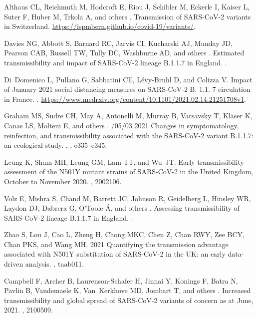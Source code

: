 \documentclass[12pt]{article}
\begin{document}
\begin{thebibliography}{10}

Althaus CL, Reichmuth M, Hodcroft E, Riou J, Schibler M, Eckerle I, Kaiser L,
  Suter F, Huber M, Trkola A, and others .
 {Transmission of SARS-CoV-2 variants in Switzerland}.
\newblock \url{https://ispmbern.github.io/covid-19/variants/}.

Davies NG, Abbott S, Barnard RC, Jarvis CI, Kucharski AJ, Munday JD, Pearson
  CAB, Russell TW, Tully DC, Washburne AD, and others .
 {Estimated transmissibility and impact of SARS-CoV-2 lineage
  B.1.1.7 in England}.
.

Di~Domenico L, Pullano G, Sabbatini CE, L{\'e}vy-Bruhl D, and Colizza V.
 {Impact of January 2021 social distancing measures on SARS-CoV-2
  B. 1.1. 7 circulation in France}.
.
\newblock \url{https://www.medrxiv.org/content/10.1101/2021.02.14.21251708v1}.

Graham MS, Sudre CH, May A, Antonelli M, Murray B, Varsavsky T, Kl{\"a}ser K,
  Canas LS, Molteni E, and others .
/05/03 2021 {Changes in symptomatology, reinfection, and
  transmissibility associated with the SARS-CoV-2 variant B.1.1.7: an
  ecological study}.
.
, e335--e345.

Leung K, Shum MH, Leung GM, Lam TT, and Wu~JT.
 {Early transmissibility assessment of the N501Y mutant strains
  of SARS-CoV-2 in the United Kingdom, October to November 2020}.
, 2002106.

Volz E, Mishra S, Chand M, Barrett JC, Johnson R, Geidelberg L, Hinsley WR,
  Laydon DJ, Dabrera G, O'Toole {\'A}, and others .
 {Assessing transmissibility of SARS-CoV-2 lineage B.1.1.7 in
  England}.
.

Zhao S, Lou J, Cao L, Zheng H, Chong MKC, Chen Z, Chan RWY, Zee BCY, Chan PKS,
  and Wang MH.
 2021 {Quantifying the transmission advantage associated with N501Y
  substitution of SARS-CoV-2 in the UK: an early data-driven analysis}.
.
\newblock taab011.

Campbell F, Archer B, Laurenson-Schafer H, Jinnai Y, Konings F, Batra N, Pavlin
  B, Vandemaele K, Van~Kerkhove MD, Jombart T, and others .
 Increased transmissibility and global spread of {SARS-CoV-2}
  variants of concern as at {June}, 2021.
, 2100509.


\end{thebibliography}
\end{document}
